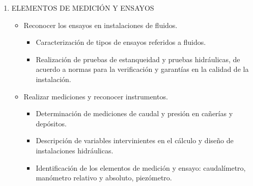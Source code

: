 \documentclass[../main]{subfiles}
\begin{document}
\begin{enumerate}
\begin{itemize}
\begin{itemize}
          \item Cálculo de la capacidad en cilindros, presiones
            admisibles y métodos de protección ante la humedad; purgadores.
          \item Descripción de los componentes de un sistema de
            utilización neumático: tipos de válvulas, actuadores,
            elementos auxiliares, lógica de funcionamiento de los circuitos.
          \item Identificación y descripción de equipos y componentes
            electroneumáticos presentes en los subsistemas de
            producción y utilización que son posibles de automatizar.
          \item Identificación de ventiladores y
            extractores y puesta a punto de dichos equipos.
        \end{itemize}
      \item Automatizar sistemas neumáticos a través del uso de componentes.
        \begin{itemize}
          \item Identificación de los componentes que pueden automatizarse.
          \item Análisis de las fuerzas necesarias para desplazar los
            accionamientos en los tiempos calculados.
          \item Aplicación de elementos en líneas de producción o
            sistemas en donde sea necesaria la automatización.
        \end{itemize}
    \end{itemize}
  \item ELEMENTOS DE MEDICIÓN Y ENSAYOS
    \begin{itemize}
      \item Reconocer los ensayos en instalaciones de fluidos.
        \begin{itemize}
          \item Caracterización de tipos de ensayos referidos a fluidos.
          \item Realización de pruebas de estanqueidad y pruebas
            hidráulicas, de acuerdo a normas para la verificación y
            garantías en la calidad de la instalación.
        \end{itemize}
      \item Realizar mediciones y reconocer instrumentos.
        \begin{itemize}
          \item  Determinación de mediciones de caudal y presión en
            cañerías y depósitos.
          \item Descripción de variables intervinientes en el cálculo
            y diseño de instalaciones hidráulicas.
          \item Identificación de los elementos de medición y ensayo:
            caudalímetro, manómetro relativo y absoluto, piezómetro.
        \end{itemize}
    \end{itemize}
\end{enumerate}
\newpage
\tableofcontents
\newpage
\end{document}

